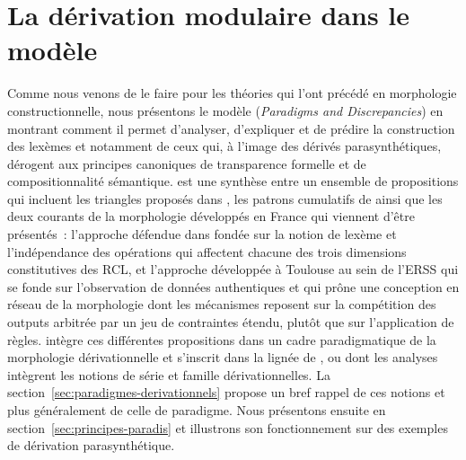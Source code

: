 \documentclass[output=paper]{langsci/langscibook}
\begin{document}
\section{La dérivation modulaire dans le modèle \paradis{}}
\label{sec:paradis}
Comme nous venons de le faire pour les théories qui l'ont précédé en morphologie constructionnelle, nous présentons le modèle \paradis{} (\emph{Paradigms and Discrepancies}) en montrant comment il permet d'analyser, d'expliquer et de prédire la construction des lexèmes et notamment de ceux qui, à l'image des dérivés parasynthétiques, dérogent aux principes canoniques de transparence formelle et de compositionnalité sémantique.
%
\paradis{} est une synthèse entre un ensemble de propositions qui incluent les triangles proposés dans \cite{Lignon2014}, les patrons cumulatifs de \cite{Bochner93} ainsi que les deux courants de la morphologie développés en France qui viennent d'être présentés~: l'approche défendue dans \cite{Fradin03} fondée sur la notion de lexème et l'indépendance des opérations qui affectent chacune des trois dimensions constitutives des RCL, et l'approche développée à Toulouse au sein de l'ERSS \citep{roche2011.dumal} qui se fonde sur l'observation de données authentiques et qui prône une conception en réseau de la morphologie dont les mécanismes reposent sur la compétition des outputs arbitrée par un jeu de contraintes étendu, plutôt que sur l'application de règles. \paradis{} intègre ces différentes propositions dans un cadre paradigmatique de la morphologie dérivationnelle et s'inscrit dans la lignée de \citet{roche2009.bslp,roche2010.rlv,roche2011.intro-dumal}, \citet{plenat2012.CMLF} ou \citet{hathout2008.textgraphs3} dont les analyses intègrent les notions de série et famille dérivationnelles.
%
La section~\ref{sec:paradigmes-derivationnels} propose un bref rappel de ces notions et plus généralement de celle de paradigme.  Nous présentons ensuite \paradis{} en section~\ref{sec:principes-paradis} et illustrons son fonctionnement sur des exemples de dérivation parasynthétique.
\end{document}
